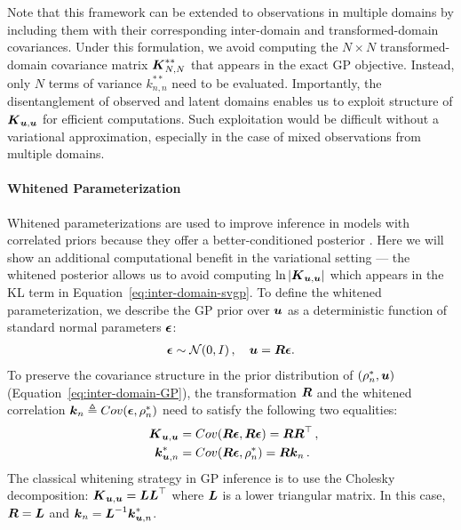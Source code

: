 Note that this framework can be extended to observations in multiple domains
by including them with their corresponding inter-domain and transformed-domain covariances.
Under this formulation, we avoid computing the $N \times N$
transformed-domain covariance matrix $\boldsymbol{K}_{N,N}^{**}$ that appears in the exact GP objective.
Instead, only $N$ terms of variance $k_{n,n}^{**}$ need to be evaluated. 
Importantly, the disentanglement of observed and latent domains
enables us to exploit structure of  $\boldsymbol{K}_{\boldsymbol{u}, \boldsymbol{u}}$ for efficient computations.
Such exploitation would be difficult without a variational approximation,
especially in the case of mixed observations from multiple domains.

\paragraph{Whitened Parameterization}
Whitened parameterizations are used to improve
inference in models with correlated priors because they offer a
better-conditioned posterior
\citep{murray2010slice, hensman2015mcmc}.
Here we will show an additional computational benefit
in the variational setting --- the whitened posterior allows us to
avoid computing $\ln |\boldsymbol{K}_{\boldsymbol{u},\boldsymbol{u}}|$ which appears in the KL term
in Equation~\ref{eq:inter-domain-svgp}.
To define the whitened parameterization, we describe the GP prior over
$\boldsymbol{u}$ as a deterministic function of standard normal parameters $\boldsymbol{\epsilon}$: 
\begin{align}
  \boldsymbol{\epsilon} \sim \mathcal{N}(0, I) \,, \quad
  \boldsymbol{u} = \boldsymbol{R} \boldsymbol{\epsilon}.
\end{align}
To preserve the covariance structure in the prior distribution of $(\rho^*_n, \boldsymbol{u})$ (Equation~\ref{eq:inter-domain-GP}),
the transformation $\boldsymbol{R}$ and
the whitened correlation $\boldsymbol{k}_n \triangleq Cov(\boldsymbol{\epsilon}, \rho^*_n)$ need to satisfy the following two equalities:  
\begin{equation}
  \begin{aligned}
  \label{eq:whitened-criteria}
  \boldsymbol{K}_{\boldsymbol{u}, \boldsymbol{u}} &=  Cov( \boldsymbol{R} \boldsymbol{\epsilon}, \boldsymbol{R} \boldsymbol{\epsilon}) =   \boldsymbol{R} \boldsymbol{R}^\top \, , \\
  \quad  \boldsymbol{k}^{*}_{\boldsymbol{u}, n} &= Cov(\boldsymbol{R} \boldsymbol{\epsilon}, \rho^*_n) = \boldsymbol{R} \boldsymbol{k}_n \, . 
\end{aligned}
\end{equation}
The classical whitening strategy in GP inference is to use the Cholesky decomposition: $\boldsymbol{K}_{\boldsymbol{u}, \boldsymbol{u}} = \boldsymbol{L} \boldsymbol{L}^\top$ where  $\boldsymbol{L}$ is a lower triangular matrix. In this case, $\boldsymbol{R} = \boldsymbol{L}$ 
and $\boldsymbol{k}_n = \boldsymbol{L}^{-1} \boldsymbol{k}^*_{\boldsymbol{u}, n}$.

